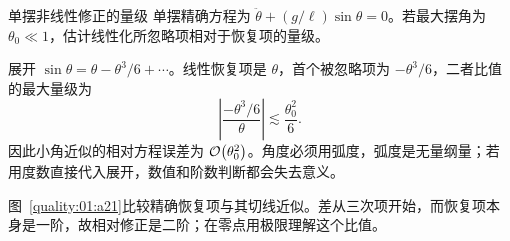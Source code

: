 \begin{origexamplebox}{单摆非线性修正的量级}
单摆精确方程为 $\ddot\theta+(g/\ell)\sin\theta=0$。若最大摆角为 $\theta_0\ll1$，估计线性化所忽略项相对于恢复项的量级。

\end{origexamplebox}
\begin{xesolution}
展开 $\sin\theta=\theta-\theta^3/6+\cdots$。线性恢复项是 $\theta$，首个被忽略项为 $-\theta^3/6$，二者比值的最大量级为
\[
 \left|\frac{-\theta^3/6}{\theta}\right|\lesssim\frac{\theta_0^2}{6}.
\]
因此小角近似的相对方程误差为 $\mathcal O\!\left(\theta_0^2\right)$。角度必须用弧度，弧度是无量纲量；若用度数直接代入展开，数值和阶数判断都会失去意义。


图~\ref{quality:01:a21}比较精确恢复项与其切线近似。差从三次项开始，而恢复项本身是一阶，故相对修正是二阶；在零点用极限理解这个比值。
\end{xesolution}


